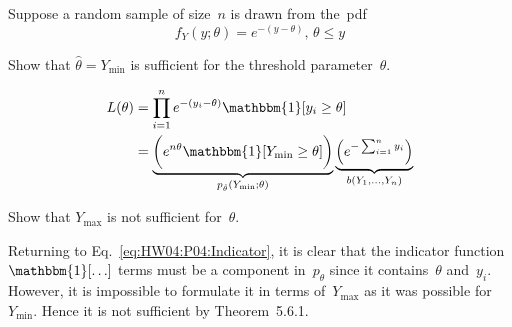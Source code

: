 \begin{problem}
   Suppose a random sample of size~$n$ is drawn from the~pdf
  \begin{equation*}
    f_{Y}(y;\theta) = e^{-(y-\theta)}\text{,  } \theta \leq y
  \end{equation*}
\end{problem}

\begin{subproblem}
  Show that ${\hat{\theta} = Y_{\min}}$ is sufficient for the threshold parameter~$\theta$.
\end{subproblem}
\begin{align}
  L(\theta) &= \prod_{i=1}^{n} e^{-(y_i - \theta)} \mathbbm{1}\sbrack{y_i \geq \theta} \label{eq:HW04:P04:Indicator}\\
            &= \underbrace{\bigg(e^{n\theta} \mathbbm{1}\sbrack{Y_{\min} \geq \theta} \bigg)}_{p_{\hat{\theta}}(Y_{\min};\theta)} \underbrace{\left( e^{-\sum_{i=1}^{n} y_i}  \right)}_{b(Y_1,\ldots,Y_{n})}
\end{align}

\begin{subproblem}
  Show that $Y_{\max}$ is not sufficient for~$\theta$.
\end{subproblem}

Returning to Eq.~\ref{eq:HW04:P04:Indicator}, it is clear that the indicator function~$\mathbbm{1}\sbrack{\ldots}$ terms must be a component in~$p_{\hat{\theta}}$ since it contains~$\theta$ and~$y_i$.  However, it is impossible to formulate it in terms of~$Y_{\max}$ as it was possible for~${Y_{\min}}$.  Hence it is not sufficient by Theorem~5.6.1.
